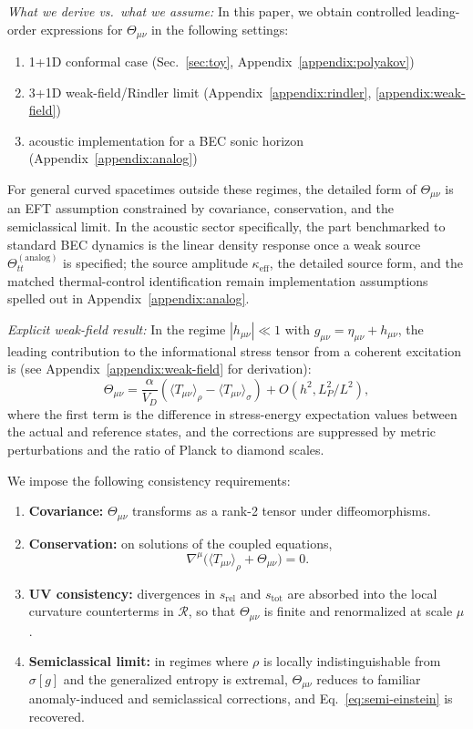 \documentclass[aps,prd,twocolumn,superscriptaddress,nofootinbib,floatfix]{revtex4-2}
\newcommand{\Rdens}{\mathcal{R}}
\newcommand{\Tmn}{\Theta_{\mu\nu}}
\newcommand{\sr}{s_{\mathrm{rel}}}
\newcommand{\stot}{s_{\mathrm{tot}}}
\begin{document}
\emph{What we derive vs.\ what we assume:} In this paper, we obtain controlled leading-order expressions for $\Tmn$ in the following settings:
\begin{enumerate}
    \item 1+1D conformal case (Sec.~\ref{sec:toy}, Appendix~\ref{appendix:polyakov})
    \item 3+1D weak-field/Rindler limit (Appendix~\ref{appendix:rindler}, \ref{appendix:weak-field})
    \item acoustic implementation for a BEC sonic horizon (Appendix~\ref{appendix:analog})
\end{enumerate}
For general curved spacetimes outside these regimes, the detailed form of $\Tmn$ is an EFT assumption constrained by covariance, conservation, and the semiclassical limit. In the acoustic sector specifically, the part benchmarked to standard BEC dynamics is the linear density response once a weak source $\Theta_{tt}^{(\mathrm{analog})}$ is specified; the source amplitude $\kappa_{\mathrm{eff}}$, the detailed source form, and the matched thermal-control identification remain implementation assumptions spelled out in Appendix~\ref{appendix:analog}.

\emph{Explicit weak-field result:} In the regime $|h_{\mu\nu}| \ll 1$ with $g_{\mu\nu} = \eta_{\mu\nu} + h_{\mu\nu}$, the leading contribution to the informational stress tensor from a coherent excitation is (see Appendix~\ref{appendix:weak-field} for derivation):
\begin{equation}
    \Theta_{\mu\nu} = \frac{\alpha}{V_D} \left( \langle T_{\mu\nu} \rangle_\rho - \langle T_{\mu\nu} \rangle_\sigma \right) + O(h^2, L_P^2/L^2),
    \label{eq:theta-weak-explicit}
\end{equation}
where the first term is the difference in stress-energy expectation values between the actual and reference states, and the corrections are suppressed by metric perturbations and the ratio of Planck to diamond scales.

We impose the following consistency requirements:
\begin{enumerate}
    \item \textbf{Covariance:} $\Tmn$ transforms as a rank-2 tensor under diffeomorphisms.
    \item \textbf{Conservation:} on solutions of the coupled equations,
    \begin{equation}
        \nabla^\mu\big(
            \langle T_{\mu\nu}\rangle_\rho + \Tmn
        \big) = 0.
        \label{eq:theta-conservation}
    \end{equation}
    \item \textbf{UV consistency:} divergences in $\sr$ and $\stot$ are absorbed into the local curvature counterterms in $\Rdens$, so that $\Tmn$ is finite and renormalized at scale $\mu$.
    \item \textbf{Semiclassical limit:} in regimes where $\rho$ is locally indistinguishable from $\sigma[g]$ and the generalized entropy is extremal, $\Tmn$ reduces to familiar anomaly-induced and semiclassical corrections, and Eq.~\eqref{eq:semi-einstein} is recovered.
\end{enumerate}
\end{document}
